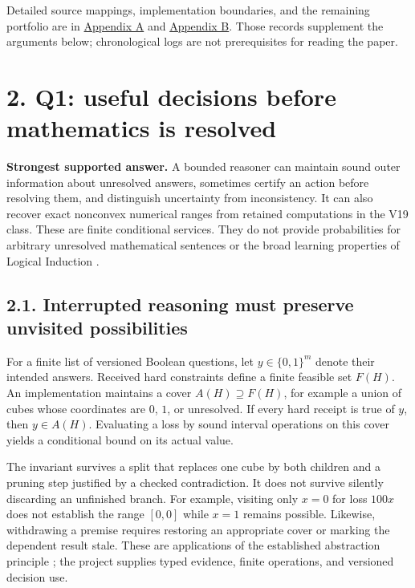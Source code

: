 \documentclass{article}
\theoremstyle{definition}
\begin{document}
Detailed source mappings, implementation boundaries, and the remaining
portfolio are in
\href{https://github.com/TristanMiano/value_logic/blob/main/v3/report/claims.md}{Appendix
A} and
\href{https://github.com/TristanMiano/value_logic/blob/main/v3/report/portfolio.md}{Appendix
B}. Those records supplement the arguments below; chronological logs are
not prerequisites for reading the paper.

\section{2. Q1: useful decisions before mathematics is
resolved}\label{sec-q1}

\textbf{Strongest supported answer.} A bounded reasoner can maintain
sound outer information about unresolved answers, sometimes certify an
action before resolving them, and distinguish uncertainty from
inconsistency. It can also recover exact nonconvex numerical ranges from
retained computations in the V19 class. These are finite conditional
services. They do not provide probabilities for arbitrary unresolved
mathematical sentences or the broad learning properties of Logical
Induction \citep{li}.

\subsection{2.1. Interrupted reasoning must preserve unvisited
possibilities}\label{sec-covers}

For a finite list of versioned Boolean questions, let \(y\in\{0,1\}^m\)
denote their intended answers. Received hard constraints define a finite
feasible set \(F(H)\). An implementation maintains a cover
\(A(H)\supseteq F(H)\), for example a union of cubes whose coordinates
are \(0\), \(1\), or unresolved. If every hard receipt is true of \(y\),
then \(y\in A(H)\). Evaluating a loss by sound interval operations on
this cover yields a conditional bound on its actual value.

The invariant survives a split that replaces one cube by both children
and a pruning step justified by a checked contradiction. It does not
survive silently discarding an unfinished branch. For example, visiting
only \(x=0\) for loss \(100x\) does not establish the range \([0,0]\)
while \(x=1\) remains possible. Likewise, withdrawing a premise requires
restoring an appropriate cover or marking the dependent result stale.
These are applications of the established abstraction principle
\citep{abstract}; the project supplies typed evidence, finite
operations, and versioned decision use.
\end{document}
